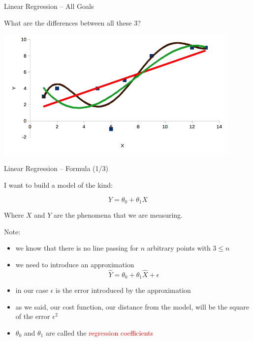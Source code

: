 \documentclass{beamer}
\begin{document}
\begin{frame}
{\centerline{Linear Regression -- All Goals}}

What are the differences between all these 3?

\begin{center}
\includegraphics[width=12cm]{P2023.AIBCCSS.FoundationsDataScience/LinearRegression_O35.png}
\end{center}

\end{frame}




\begin{frame}
{\centerline{Linear Regression -- Formula (1/3)}}
I want to build a model of the kind:

$$ Y = \theta_0 + \theta_1 X $$

Where $X$ and $Y$ are the phenomena that we are measuring.\\
\vspace*{0.3cm}

Note:
\begin{itemize}
\item we know that there is no line passing for $n$ arbitrary points with $3 \leq n$
\item we need to introduce an approximation
$$ \hat{Y} = \theta_0 + \theta_1 \hat{X} + \epsilon $$
\item in our case $\epsilon$ is the error introduced by the approximation
\item as we said, our cost function, our distance from the model, will be the square of the error $\epsilon^2$
\item $ \theta_0$ and $\theta_1$ are called the \textcolor{red}{regression coefficients}
\end{itemize}

\end{frame}
\end{document}
